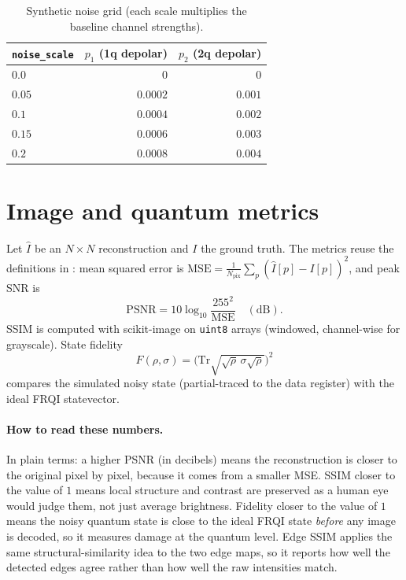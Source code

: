 \begin{table}[htbp]
\centering
\caption{Synthetic noise grid (each scale multiplies the baseline channel strengths).}
\label{tab:noise-grid}
\begin{tabular}{lrr}
\toprule
\texttt{noise\_scale} & $p_1$ (1q depolar) & $p_2$ (2q depolar) \\
\midrule
$0.0$ & $0$ & $0$ \\
$0.05$ & $0.0002$ & $0.001$ \\
$0.1$ & $0.0004$ & $0.002$ \\
$0.15$ & $0.0006$ & $0.003$ \\
$0.2$ & $0.0008$ & $0.004$ \\
\bottomrule
\end{tabular}
\end{table}

\section{Image and quantum metrics}
Let $\hat{I}$ be an $N\times N$ reconstruction and $I$ the ground truth. The metrics reuse the definitions in : mean squared error is $\mathrm{MSE}=\frac{1}{N_{\mathrm{pix}}}\sum_p (\hat{I}[p]-I[p])^2$, and peak SNR is
\begin{equation}
\mathrm{PSNR} = 10\log_{10}\frac{255^2}{\mathrm{MSE}} \quad (\mathrm{dB}) .
\end{equation}
SSIM is computed with scikit-image on \texttt{uint8} arrays (windowed, channel-wise for grayscale). State fidelity
\begin{equation}
F(\rho,\sigma)=\bigl(\mathrm{Tr}\sqrt{\sqrt{\rho}\,\sigma\sqrt{\rho}}\bigr)^2
\end{equation}
compares the simulated noisy state (partial-traced to the data register) with the ideal FRQI statevector.

\paragraph{How to read these numbers.}
In plain terms: a higher PSNR (in decibels) means the reconstruction is closer to the original pixel by pixel, because it comes from a smaller MSE. SSIM closer to the value of $1$ means local structure and contrast are preserved as a human eye would judge them, not just average brightness. Fidelity closer to the value of $1$ means the noisy quantum state is close to the ideal FRQI state \emph{before} any image is decoded, so it measures damage at the quantum level. Edge SSIM applies the same structural-similarity idea to the two edge maps, so it reports how well the detected edges agree rather than how well the raw intensities match.

